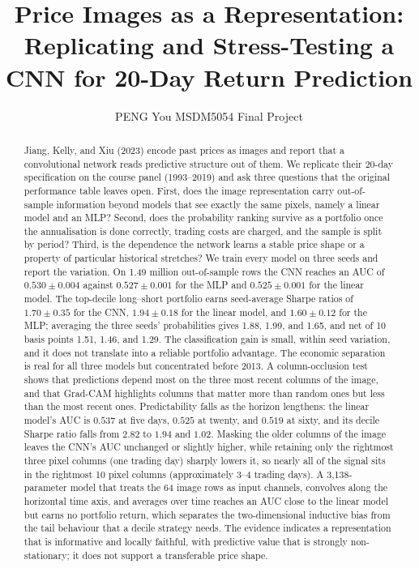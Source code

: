 \documentclass[10pt]{article}
\title{\vspace{-1.4em}\bf Price Images as a Representation:\\ Replicating and Stress-Testing a CNN for 20-Day Return Prediction}
\author{PENG You \quad MSDM5054 Final Project}
\date{}
\begin{document}
\maketitle
\vspace{-1.6em}

\begin{abstract}
\noindent
Jiang, Kelly, and Xiu (2023) encode past prices as images and report that a convolutional network reads predictive structure out of them. We replicate their 20-day specification on the course panel (1993--2019) and ask three questions that the original performance table leaves open. First, does the image representation carry out-of-sample information beyond models that see exactly the same pixels, namely a linear model and an MLP? Second, does the probability ranking survive as a portfolio once the annualisation is done correctly, trading costs are charged, and the sample is split by period? Third, is the dependence the network learns a stable price shape or a property of particular historical stretches? We train every model on three seeds and report the variation. On 1.49 million out-of-sample rows the CNN reaches an AUC of $0.530\pm0.004$ against $0.527\pm0.001$ for the MLP and $0.525\pm0.001$ for the linear model. The top-decile long--short portfolio earns seed-average Sharpe ratios of $1.70\pm0.35$ for the CNN, $1.94\pm0.18$ for the linear model, and $1.60\pm0.12$ for the MLP; averaging the three seeds' probabilities gives 1.88, 1.99, and 1.65, and net of 10 basis points 1.51, 1.46, and 1.29. The classification gain is small, within seed variation, and it does not translate into a reliable portfolio advantage. The economic separation is real for all three models but concentrated before 2013. A column-occlusion test shows that predictions depend most on the three most recent columns of the image, and that Grad-CAM highlights columns that matter more than random ones but less than the most recent ones. Predictability falls as the horizon lengthens: the linear model's AUC is $0.537$ at five days, $0.525$ at twenty, and $0.519$ at sixty, and its decile Sharpe ratio falls from $2.82$ to $1.94$ and $1.02$. Masking the older columns of the image leaves the CNN's AUC unchanged or slightly higher, while retaining only the rightmost three pixel columns (one trading day) sharply lowers it, so nearly all of the signal sits in the rightmost 10 pixel columns (approximately 3--4 trading days). A 3{,}138-parameter model that treats the 64 image rows as input channels, convolves along the horizontal time axis, and averages over time reaches an AUC close to the linear model but earns no portfolio return, which separates the two-dimensional inductive bias from the tail behaviour that a decile strategy needs. The evidence indicates a representation that is informative and locally faithful, with predictive value that is strongly non-stationary; it does not support a transferable price shape.
\end{abstract}
\end{document}

